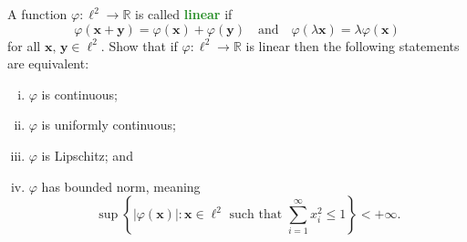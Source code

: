 \documentclass[11pt]{scrartcl}
\providecommand{\RR}{\mathbb R}
\providecommand{\ii}{\item}
\providecommand{\mb}[1]{\mathbf{#1}}
\providecommand{\vocab}[1]{{\textbf{\textcolor{ForestGreen}{#1}}}}
\begin{document}
\begin{problem}
	A function $\varphi\colon\ell^2\to\RR$ is called \vocab{linear} if
	\[\varphi(\mb x + \mb y) = \varphi(\mb x) + \varphi(\mb y)\quad
	\text{and}\quad
	\varphi(\lambda\mb x) = \lambda\varphi(\mb x)\]
	for all $\mb x,\,\mb y\in\ell^2$.
	Show that if $\varphi\colon\ell^2\to\RR$ is linear
	then the following statements are equivalent:
	\begin{enumerate}[(i)]
		\ii $\varphi$ is continuous;
		\ii $\varphi$ is uniformly continuous;
		\ii $\varphi$ is Lipschitz; and
		\ii $\varphi$ has bounded norm, meaning
		\[\sup\left\{|\varphi(\mb x)| : \mb x\in\ell^2\text{ such that }
		\sum_{i=1}^\infty x_i^2 \le 1\right\} < +\infty.\]
	\end{enumerate}
\end{problem}
\end{document}
